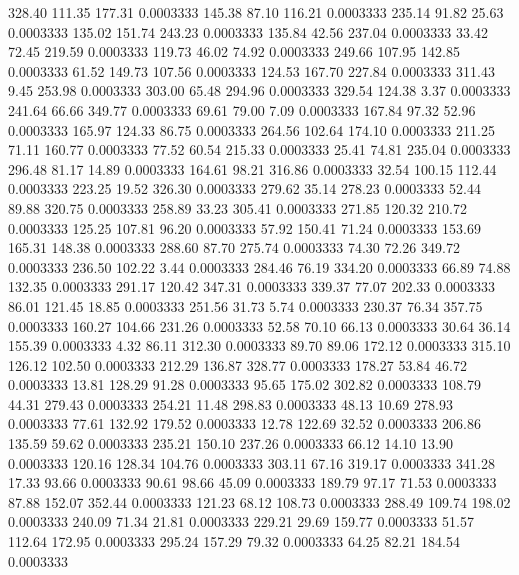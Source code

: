 328.40  111.35  177.31   0.0003333
 145.38   87.10  116.21   0.0003333
 235.14   91.82   25.63   0.0003333
 135.02  151.74  243.23   0.0003333
 135.84   42.56  237.04   0.0003333
  33.42   72.45  219.59   0.0003333
 119.73   46.02   74.92   0.0003333
 249.66  107.95  142.85   0.0003333
  61.52  149.73  107.56   0.0003333
 124.53  167.70  227.84   0.0003333
 311.43    9.45  253.98   0.0003333
 303.00   65.48  294.96   0.0003333
 329.54  124.38    3.37   0.0003333
 241.64   66.66  349.77   0.0003333
  69.61   79.00    7.09   0.0003333
 167.84   97.32   52.96   0.0003333
 165.97  124.33   86.75   0.0003333
 264.56  102.64  174.10   0.0003333
 211.25   71.11  160.77   0.0003333
  77.52   60.54  215.33   0.0003333
  25.41   74.81  235.04   0.0003333
 296.48   81.17   14.89   0.0003333
 164.61   98.21  316.86   0.0003333
  32.54  100.15  112.44   0.0003333
 223.25   19.52  326.30   0.0003333
 279.62   35.14  278.23   0.0003333
  52.44   89.88  320.75   0.0003333
 258.89   33.23  305.41   0.0003333
 271.85  120.32  210.72   0.0003333
 125.25  107.81   96.20   0.0003333
  57.92  150.41   71.24   0.0003333
 153.69  165.31  148.38   0.0003333
 288.60   87.70  275.74   0.0003333
  74.30   72.26  349.72   0.0003333
 236.50  102.22    3.44   0.0003333
 284.46   76.19  334.20   0.0003333
  66.89   74.88  132.35   0.0003333
 291.17  120.42  347.31   0.0003333
 339.37   77.07  202.33   0.0003333
  86.01  121.45   18.85   0.0003333
 251.56   31.73    5.74   0.0003333
 230.37   76.34  357.75   0.0003333
 160.27  104.66  231.26   0.0003333
  52.58   70.10   66.13   0.0003333
  30.64   36.14  155.39   0.0003333
   4.32   86.11  312.30   0.0003333
  89.70   89.06  172.12   0.0003333
 315.10  126.12  102.50   0.0003333
 212.29  136.87  328.77   0.0003333
 178.27   53.84   46.72   0.0003333
  13.81  128.29   91.28   0.0003333
  95.65  175.02  302.82   0.0003333
 108.79   44.31  279.43   0.0003333
 254.21   11.48  298.83   0.0003333
  48.13   10.69  278.93   0.0003333
  77.61  132.92  179.52   0.0003333
  12.78  122.69   32.52   0.0003333
 206.86  135.59   59.62   0.0003333
 235.21  150.10  237.26   0.0003333
  66.12   14.10   13.90   0.0003333
 120.16  128.34  104.76   0.0003333
 303.11   67.16  319.17   0.0003333
 341.28   17.33   93.66   0.0003333
  90.61   98.66   45.09   0.0003333
 189.79   97.17   71.53   0.0003333
  87.88  152.07  352.44   0.0003333
 121.23   68.12  108.73   0.0003333
 288.49  109.74  198.02   0.0003333
 240.09   71.34   21.81   0.0003333
 229.21   29.69  159.77   0.0003333
  51.57  112.64  172.95   0.0003333
 295.24  157.29   79.32   0.0003333
  64.25   82.21  184.54   0.0003333
